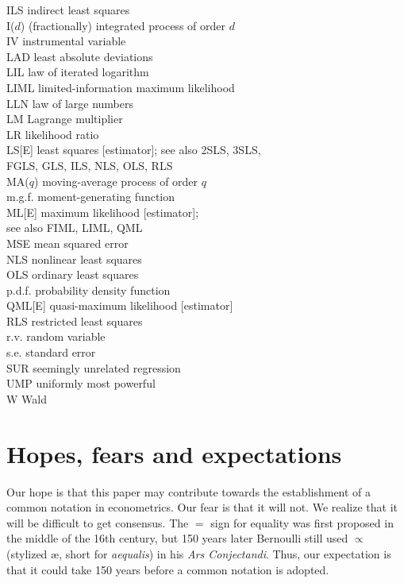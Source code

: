 \documentclass[11pt,dvips,a4paper]{article}
\begin{document}
\begin{tabbing}
ILS \> indirect least squares \\
I($d$) \> (fractionally) integrated process of order $d$ \\
IV \> instrumental variable \\
LAD \> least absolute deviations \\
LIL \> law of iterated logarithm \\
LIML \> limited-information maximum likelihood \\
LLN \> law of large numbers \\
LM \> Lagrange multiplier \\
LR \> likelihood ratio \\
LS[E] \> least squares [estimator]; see also 2SLS, 3SLS,\\
\> FGLS, GLS, ILS, NLS, OLS, RLS  \\
MA($q$) \> moving-average process of order $q$ \\
m.g.f. \> moment-generating function \\
ML[E] \> maximum likelihood [estimator]; \\
\> see also FIML, LIML, QML  \\
MSE \> mean squared error   \\
NLS \> nonlinear least squares \\
OLS \> ordinary least squares \\
p.d.f. \> probability density function \\
QML[E] \> quasi-maximum likelihood [estimator] \\
RLS \> restricted least squares \\
r.v. \> random variable \\
s.e. \> standard error \\
SUR \> seemingly unrelated regression\\
UMP \> uniformly most powerful \\
W \> Wald
\end{tabbing}
%
\section{Hopes, fears and expectations}
Our hope is that this paper may contribute towards the establishment
of a common notation in econometrics.
Our fear is that it will not.
We realize that it will be difficult to get consensus.
The $=$ sign for equality was first proposed
in the middle of the 16th century, but 150 years later Bernoulli
still used $\propto$ (stylized \ae, short for {\it aequalis\/})
in his {\it Ars Conjectandi\/}.
Thus, our expectation is that it could take 150 years before a
common notation is adopted.
%
\end{document}
